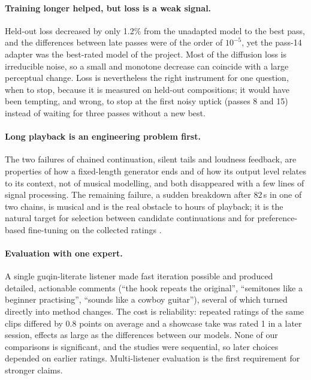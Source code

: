 \paragraph{Training longer helped, but loss is a weak signal.} Held-out loss decreased by only 1.2\% from the unadapted
model to the best pass, and the differences between late passes were of the order of $10^{-5}$, yet the pass-14
adapter was the best-rated model of the project. Most of the diffusion loss is irreducible noise, so a small and
monotone decrease can coincide with a large perceptual change. Loss is nevertheless the right instrument for one
question, when to stop, because it is measured on held-out compositions; it would have been tempting, and wrong, to
stop at the first noisy uptick (passes 8 and 15) instead of waiting for three passes without a new best.

\paragraph{Long playback is an engineering problem first.} The two failures of chained continuation, silent tails and
loudness feedback, are properties of how a fixed-length generator ends and of how its output level relates to its
context, not of musical modelling, and both disappeared with a few lines of signal processing. The remaining failure,
a sudden breakdown after 82\,s in one of two chains, is musical and is the real obstacle to hours of playback; it is
the natural target for selection between candidate continuations and for preference-based fine-tuning on the
collected ratings \citep{wallace2023diffusiondpo}.

\paragraph{Evaluation with one expert.} A single guqin-literate listener made fast iteration possible and produced
detailed, actionable comments (``the hook repeats the original'', ``semitones like a beginner practising'',
``sounds like a cowboy guitar''), several of which turned directly into method changes. The cost is reliability:
repeated ratings of the same clips differed by 0.8 points on average and a showcase take was rated 1 in a later
session, effects as large as the differences between our models. None of our comparisons is significant, and the
studies were sequential, so later choices depended on earlier ratings. Multi-listener evaluation is the first
requirement for stronger claims.

